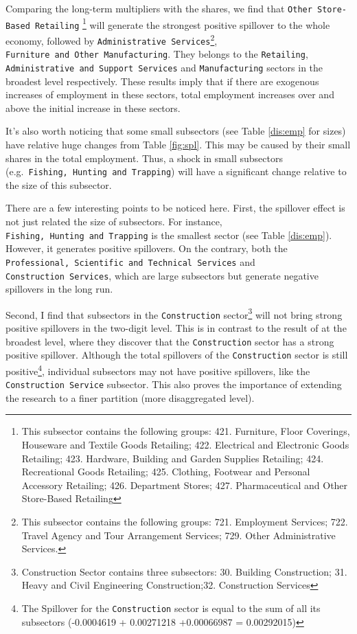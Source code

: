 \documentclass{monashthesis}
\begin{document}
Comparing the long-term multipliers with the shares, we find that \texttt{Other\ Store-Based\ Retailing} \footnote{This subsector contains the following groups: 421. Furniture, Floor Coverings, Houseware and Textile Goods Retailing; 422. Electrical and Electronic Goods Retailing; 423. Hardware, Building and Garden Supplies Retailing; 424. Recreational Goods Retailing; 425. Clothing, Footwear and Personal Accessory Retailing; 426. Department Stores; 427. Pharmaceutical and Other Store-Based Retailing} will generate the strongest positive spillover to the whole economy, followed by \texttt{Administrative\ Services}\footnote{This subsector contains the following groups: 721. Employment Services; 722. Travel Agency and Tour Arrangement Services; 729. Other Administrative Services.}, \texttt{Furniture\ and\ Other\ Manufacturing}. They belongs to the \texttt{Retailing}, \texttt{Administrative\ and\ Support\ Services} and \texttt{Manufacturing} sectors in the broadest level respectively. These results imply that if there are exogenous increases of employment in these sectors, total employment increases over and above the initial increase in these sectors.

It's also worth noticing that some small subsectors (see Table \ref{dis:emp} for sizes) have relative huge changes from Table \ref{fig:spl}. This may be caused by their small shares in the total employment. Thus, a shock in small subsectors (e.g.~\texttt{Fishing,\ Hunting\ and\ Trapping}) will have a significant change relative to the size of this subsector.

There are a few interesting points to be noticed here. First, the spillover effect is not just related the size of subsectors. For instance, \texttt{Fishing,\ Hunting\ and\ Trapping} is the smallest sector (see Table \ref{dis:emp}). However, it generates positive spillovers. On the contrary, both the \texttt{Professional,\ Scientific\ and\ Technical\ Services} and \texttt{Construction\ Services}, which are large subsectors but generate negative spillovers in the long run.

Second, I find that subsectors in the \texttt{Construction} sector\footnote{Construction Sector contains three subsectors: 30. Building Construction; 31. Heavy and Civil Engineering Construction;32. Construction Services} will not bring strong positive spillovers in the two-digit level. This is in contrast to the result of \textcite{anderson2020} at the broadest level, where they discover that the \texttt{Construction} sector has a strong positive spillover. Although the total spillovers of the \texttt{Construction} sector is still positive\footnote{The Spillover for the \texttt{Construction} sector is equal to the sum of all its subsectors (-0.0004619 + 0.00271218 +0.00066987 = 0.00292015)}, individual subsectors may not have positive spillovers, like the \texttt{Construction\ Service} subsector. This also proves the importance of extending the research to a finer partition (more disaggregated level).
\end{document}
